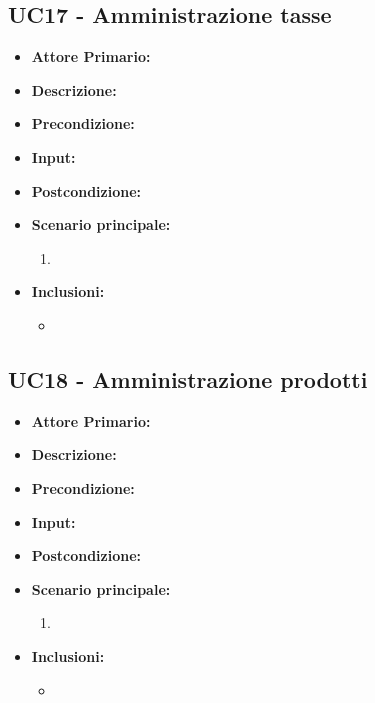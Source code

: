 \subsection{UC17 - Amministrazione tasse}
\begin{itemize}
    \item \textbf{Attore Primario:} 
    \item \textbf{Descrizione:}
    \item \textbf{Precondizione:}
    \item \textbf{Input:}
    \item \textbf{Postcondizione:}
    \item \textbf{Scenario principale:}
    \begin{enumerate}
        \item 
    \end{enumerate}
    \item \textbf{Inclusioni:}
    \begin{itemize}
        \item
    \end{itemize}
\end{itemize}

\subsection{UC18 - Amministrazione prodotti}
\begin{itemize}
    \item \textbf{Attore Primario:} 
    \item \textbf{Descrizione:}
    \item \textbf{Precondizione:}
    \item \textbf{Input:}
    \item \textbf{Postcondizione:}
    \item \textbf{Scenario principale:}
    \begin{enumerate}
        \item 
    \end{enumerate}
    \item \textbf{Inclusioni:}
    \begin{itemize}
        \item
    \end{itemize}
\end{itemize}


